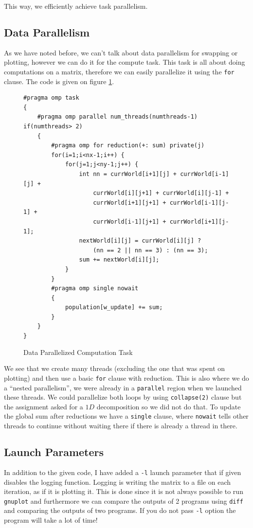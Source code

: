 \documentclass[11pt,reqno]{amsart}
\newcommand{\code}[1]{\texttt{#1}}
\begin{document}
This way, we efficiently achieve task parallelism.

\subsection{Data Parallelism}
As we have noted before, we can't talk about data parallelism for swapping or plotting, however we can do it for the compute task. This task is all about doing computations on a matrix, therefore we can easily parallelize it using the \code{for} clause. The code is given on figure \ref{fig:dataparcompute}.

\begin{figure}[h]
\centering
\label{fig:dataparcompute}
\begin{lstlisting}
#pragma omp task
{
    #pragma omp parallel num_threads(numthreads-1) if(numthreads> 2)
    {
        #pragma omp for reduction(+: sum) private(j) 
        for(i=1;i<nx-1;i++) {
            for(j=1;j<ny-1;j++) {
                int nn = currWorld[i+1][j] + currWorld[i-1][j] + 
                    currWorld[i][j+1] + currWorld[i][j-1] + 
                    currWorld[i+1][j+1] + currWorld[i-1][j-1] + 
                    currWorld[i-1][j+1] + currWorld[i+1][j-1];
                nextWorld[i][j] = currWorld[i][j] ? 
                    (nn == 2 || nn == 3) : (nn == 3);
                sum += nextWorld[i][j];
            }
        } 
        #pragma omp single nowait
        {
            population[w_update] += sum;
        }
    }
}
\end{lstlisting}
\caption{Data Parallelized Computation Task}
\end{figure}

We see that we create many threads (excluding the one that was spent on plotting) and then use a basic \code{for} clause with reduction. This is also where we do a ``nested parallelism'', we were already in a \code{parallel} region when we launched these threads. We could parallelize both loops by using \code{collapse(2)} clause but the assignment asked for a $1D$ decomposition so we did not do that. To update the global sum after reductions we have a \code{single} clause, where \code{nowait} tells other threads to continue without waiting there if there is already a thread in there.

\subsection{Launch Parameters}

In addition to the given code, I have added a \code{-l} launch parameter that if given disables the logging function. Logging is writing the matrix to a file on each iteration, as if it is plotting it. This is done since it is not always possible to run \code{gnuplot} and furthermore we can compare the outputs of 2 programs using \code{diff} and comparing the outputs of two programs. If you do not pass \code{-l} option the program will take a lot of time!
\end{document}
